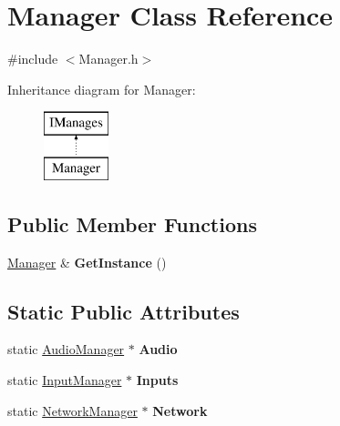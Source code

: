 \hypertarget{classManager}{}\section{Manager Class Reference}
\label{classManager}


{\ttfamily \#include $<$Manager.\+h$>$}

Inheritance diagram for Manager\+:\begin{figure}[H]
\begin{center}
\leavevmode
\includegraphics[height=2.000000cm]{classManager}
\end{center}
\end{figure}
\subsection*{Public Member Functions}
\begin{DoxyCompactItemize}
\item 
\hypertarget{classManager_a858943fdd03bfb1c692c56482094e3a0}{}\hyperlink{classManager}{Manager} \& {\bfseries Get\+Instance} ()\label{classManager_a858943fdd03bfb1c692c56482094e3a0}

\end{DoxyCompactItemize}
\subsection*{Static Public Attributes}
\begin{DoxyCompactItemize}
\item 
\hypertarget{classManager_a24e66f6bd92ae6dcb6853d4f9a24c919}{}static \hyperlink{classAudioManager}{Audio\+Manager} $\ast$ {\bfseries Audio}\label{classManager_a24e66f6bd92ae6dcb6853d4f9a24c919}

\item 
\hypertarget{classManager_af9a422e393f203745c8711143e2b28f2}{}static \hyperlink{classInputManager}{Input\+Manager} $\ast$ {\bfseries Inputs}\label{classManager_af9a422e393f203745c8711143e2b28f2}

\item 
\hypertarget{classManager_ad69b402c809daa162b40b0344dbe691e}{}static \hyperlink{classNetworkManager}{Network\+Manager} $\ast$ {\bfseries Network}\label{classManager_ad69b402c809daa162b40b0344dbe691e}

\end{DoxyCompactItemize}


